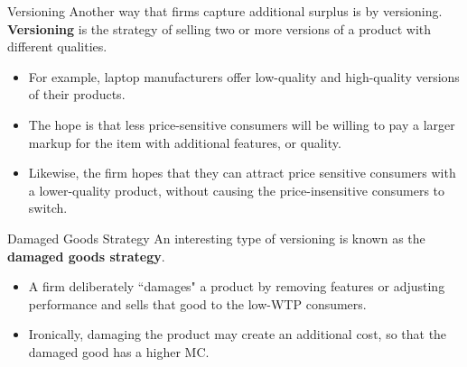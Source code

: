 \documentclass[11pt,t]{beamer}
\begin{document}
\begin{frame}
  
\end{frame}

\begin{frame}{Versioning}
  Another way that firms capture additional surplus is by versioning. \textbf{Versioning} is the strategy of selling two or more versions of a product with different qualities.

  \begin{itemize}
    \item For example, laptop manufacturers offer low-quality and high-quality versions of their products.
    
    \item The hope is that less price-sensitive consumers will be willing to pay a larger markup for the item with additional features, or quality.
    
    \item Likewise, the firm hopes that they can attract price sensitive consumers with a lower-quality product, without causing the price-insensitive consumers to switch.
  \end{itemize}


\end{frame}

\begin{frame}{Damaged Goods Strategy}
  An interesting type of versioning is known as the \textbf{damaged goods strategy}.

  \begin{itemize}
    \item A firm deliberately ``damages" a product by removing features or adjusting performance and sells that good to the low-WTP consumers.
    
    \item Ironically, damaging the product may create an additional cost, so that the damaged good has a higher MC.
  \end{itemize}
\end{frame}
\end{document}
